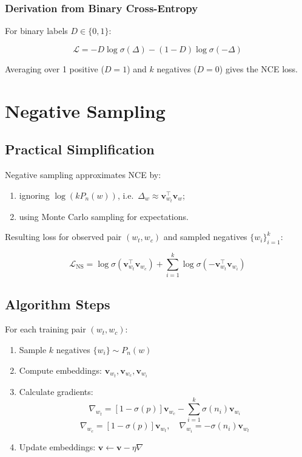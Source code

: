 \begin{notechapter}
\subsubsection{Derivation from Binary Cross-Entropy}
For binary labels \( D \in \{0,1\} \):

\[
\mathcal{L} = -D \log \sigma(\Delta) - (1-D) \log \sigma(-\Delta)
\]

Averaging over 1 positive (\( D=1 \)) and \( k \) negatives 
(\( D=0 \)) gives the NCE loss.

\section{Negative Sampling}
\subsection{Practical Simplification}
Negative sampling approximates NCE by:
\begin{enumerate}
\item ignoring \( \log(kP_n(w)) \), i.e.\ \( \Delta_w \approx
\mathbf{v}_{w_t}^\top \mathbf{v}_w \);
\item using Monte Carlo sampling for expectations.
\end{enumerate}

Resulting loss for observed pair \( (w_t,w_c) \) and 
sampled negatives \( \{w_i\}_{i=1}^k \):

\[
\mathcal{L}_{\text{NS}} = \log \sigma(\mathbf{v}_{w_t}^\top 
\mathbf{v}_{w_c}) + \sum_{i=1}^k \log \sigma(-\mathbf{v}_{w_t}^\top 
\mathbf{v}_{w_i})
\]

\subsection{Algorithm Steps}
For each training pair \( (w_t,w_c) \):
\begin{enumerate}
    \item Sample \( k \) negatives \( \{w_i\} \sim P_n(w) \)
    \item Compute embeddings: \( \mathbf{v}_{w_t}, \mathbf{v}_{w_c}, 
    \mathbf{v}_{w_i} \)
    \item Calculate gradients:
    \[
    \nabla_{w_t} = [1-\sigma(p)]\mathbf{v}_{w_c} 
    - \sum_{i=1}^k \sigma(n_i)\mathbf{v}_{w_i}
    \]
    \[
    \nabla_{w_c} = [1-\sigma(p)]\mathbf{v}_{w_t}, \quad 
    \nabla_{w_i} = -\sigma(n_i)\mathbf{v}_{w_t}
    \]
    \item Update embeddings: 
    \( \mathbf{v} \leftarrow \mathbf{v} - \eta \nabla \)
\end{enumerate}


\end{notechapter}

